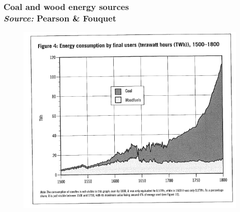 \documentclass[final]{beamer}
\begin{document}
\begin{frame}
\frametitle{Coal and wood energy sources\\\textit{Source:} Pearson \& Fouquet}
\begin{figure}[p!]
\center
\label{fig:woodCoal}
\includegraphics[height=0.8\textheight]{woodCoal.png}
\end{figure}
\end{frame}
\end{document}
